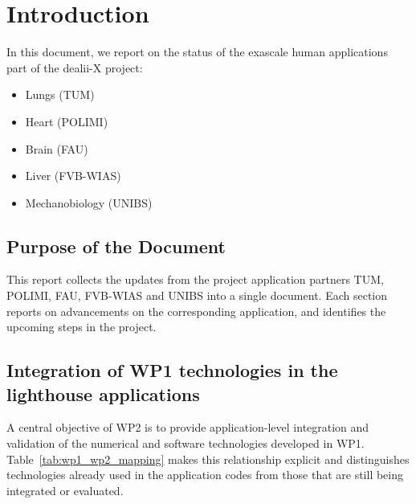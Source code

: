 \documentclass[a4paper,12pt]{article}
\begin{document}
\vspace*{2cm}

\disclaimer

\newpage

\tableofcontents %

\newpage

\section{{Introduction}}

In this document, we report on the status of the exascale human applications part of the dealii-X project:
\begin{itemize}
    \item Lungs (TUM)
    \item Heart (POLIMI)
    \item Brain (FAU)
    \item Liver (FVB-WIAS)
    \item Mechanobiology (UNIBS)
\end{itemize}

\subsection{{Purpose of the Document}}

This report collects the updates from the project application partners TUM, POLIMI, FAU, FVB-WIAS and UNIBS into a single document. Each section reports on advancements on the corresponding application, and identifies the upcoming steps in the project.


\subsection{Integration of WP1 technologies in the lighthouse applications}
\label{sec:wp1_wp2_mapping}

A central objective of WP2 is to provide application-level integration and
validation of the numerical and software technologies developed in WP1.
Table~\ref{tab:wp1_wp2_mapping} makes this relationship explicit and
distinguishes technologies already used in the application codes from those
that are still being integrated or evaluated.
\end{document}
